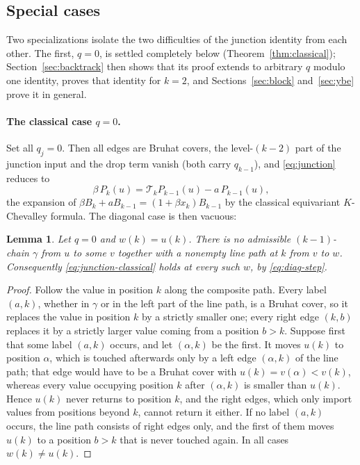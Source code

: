 \documentclass[11pt]{article}
\newtheorem{lemma}[proposition]{Lemma}
\begin{document}
\subsection{Special cases}
\label{sec:special}

Two specializations isolate the two difficulties of the junction
identity from each other. The first, $q=0$, is settled completely
below (Theorem~\ref{thm:classical}); Section~\ref{sec:backtrack} then
shows that its proof extends to arbitrary $q$ modulo one identity,
proves that identity for $k=2$, and Sections~\ref{sec:block}
and~\ref{sec:ybe} prove it in general.

\paragraph{The classical case \texorpdfstring{$q=0$}{q=0}.}
Set all $q_j=0$. Then all edges are Bruhat covers, the level-$(k-2)$
part of the junction input and the drop term vanish (both carry
$q_{k-1}$), and \eqref{eq:junction} reduces to
\begin{equation}\label{eq:junction-classical}
 \beta\,P_k(u)=\mathcal T_kP_{k-1}(u)-a\,P_{k-1}(u),
\end{equation}
the expansion of $\beta B_k+aB_{k-1}=(1+\beta x_k)B_{k-1}$ by the
classical equivariant $K$-Chevalley formula. The diagonal case is
then vacuous:

\begin{lemma}\label{lem:classical-diagonal}
Let $q=0$ and $w(k)=u(k)$. There is no admissible $(k-1)$-chain
$\gamma$ from $u$ to some $v$ together with a nonempty line path at
$k$ from $v$ to $w$. Consequently \eqref{eq:junction-classical} holds
at every such $w$, by \eqref{eq:diag-step}.
\end{lemma}

\begin{proof}
Follow the value in position $k$ along the composite path. Every
label $(a,k)$, whether in $\gamma$ or in the left part of the line
path, is a Bruhat cover, so it replaces the value in position $k$ by
a strictly smaller one; every right edge $(k,b)$ replaces it by a
strictly larger value coming from a position $b>k$. Suppose first
that some label $(a,k)$ occurs, and let $(\alpha,k)$ be the first.
It moves $u(k)$ to position $\alpha$, which is touched afterwards
only by a left edge $(\alpha,k)$ of the line path; that edge would
have to be a Bruhat cover with $u(k)=v(\alpha)<v(k)$, whereas every
value occupying position $k$ after $(\alpha,k)$ is smaller than
$u(k)$. Hence $u(k)$ never returns to position $k$, and the right
edges, which only import values from positions beyond $k$, cannot
return it either. If no label $(a,k)$ occurs, the line path consists
of right edges only, and the first of them moves $u(k)$ to a position
$b>k$ that is never touched again. In all cases $w(k)\neq u(k)$.
\end{proof}
\end{document}
